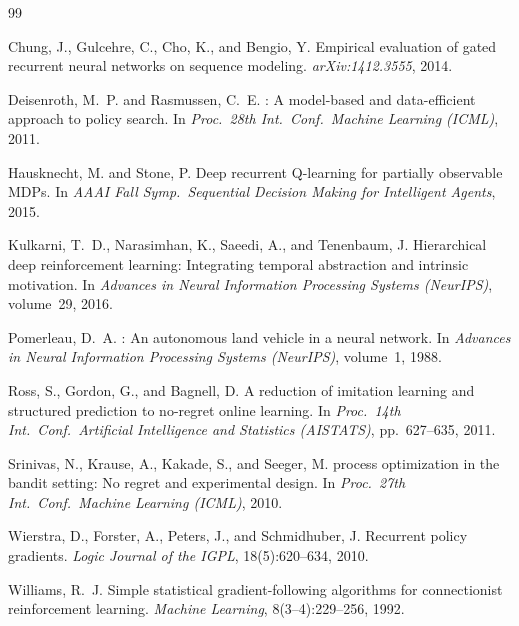 \documentclass[twoside,11pt]{article}
\begin{document}

\begin{thebibliography}{99}

Chung, J., Gulcehre, C., Cho, K., and Bengio, Y.
\newblock Empirical evaluation of gated recurrent neural networks on sequence
  modeling.
\newblock \emph{arXiv:1412.3555}, 2014.

Deisenroth, M.~P. and Rasmussen, C.~E.
: A model-based and data-efficient approach to policy search.
\newblock In \emph{Proc.\ 28th Int.\ Conf.\ Machine Learning (ICML)}, 2011.

Hausknecht, M. and Stone, P.
\newblock Deep recurrent {Q}-learning for partially observable {MDP}s.
\newblock In \emph{AAAI Fall Symp.\ Sequential Decision Making for Intelligent
  Agents}, 2015.

Kulkarni, T.~D., Narasimhan, K., Saeedi, A., and Tenenbaum, J.
\newblock Hierarchical deep reinforcement learning: Integrating temporal
  abstraction and intrinsic motivation.
\newblock In \emph{Advances in Neural Information Processing Systems
  (NeurIPS)}, volume~29, 2016.

Pomerleau, D.~A.
: An autonomous land vehicle in a neural network.
\newblock In \emph{Advances in Neural Information Processing Systems
  (NeurIPS)}, volume~1, 1988.

Ross, S., Gordon, G., and Bagnell, D.
\newblock A reduction of imitation learning and structured prediction to
  no-regret online learning.
\newblock In \emph{Proc.\ 14th Int.\ Conf.\ Artificial Intelligence and
  Statistics (AISTATS)}, pp.\ 627--635, 2011.

Srinivas, N., Krause, A., Kakade, S., and Seeger, M.
 process optimization in the bandit setting: No regret and
  experimental design.
\newblock In \emph{Proc.\ 27th Int.\ Conf.\ Machine Learning (ICML)}, 2010.

Wierstra, D., Forster, A., Peters, J., and Schmidhuber, J.
\newblock Recurrent policy gradients.
\newblock \emph{Logic Journal of the IGPL}, 18(5):620--634, 2010.

Williams, R.~J.
\newblock Simple statistical gradient-following algorithms for connectionist
  reinforcement learning.
\newblock \emph{Machine Learning}, 8(3--4):229--256, 1992.

\end{thebibliography}
\end{document}
